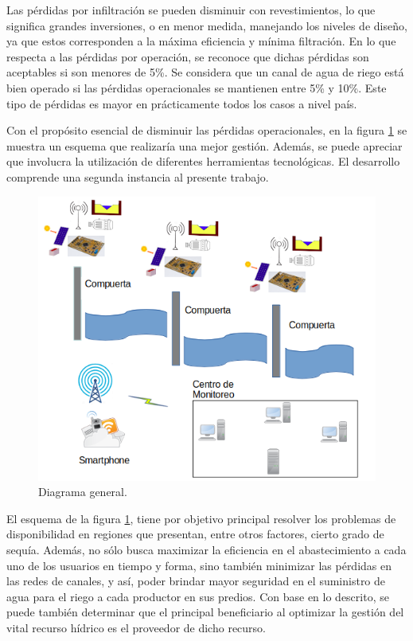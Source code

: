 Las pérdidas por infiltración se pueden disminuir con revestimientos, lo que significa grandes inversiones, o en menor medida, manejando los niveles de diseño, ya que estos corresponden a la máxima eficiencia y mínima filtración.
En lo que respecta a las pérdidas por operación, se reconoce que dichas pérdidas son aceptables si son menores de 5\%. Se considera que un canal de agua de riego está bien operado si las pérdidas operacionales se mantienen entre 5\% y 10\%. Este tipo de pérdidas es mayor en prácticamente todos los casos a nivel país.		

Con el propósito esencial de disminuir las pérdidas operacionales, en la figura \ref{fig:DiagramaEnBloqueGeneralV1} se muestra un esquema que realizaría una mejor gestión.
Además, se puede apreciar que involucra la utilización de diferentes herramientas tecnológicas. El desarrollo comprende una segunda instancia al presente trabajo. 
    
\begin{figure}[h]
\centering

\includegraphics[width=1\textwidth]{./Figures/DiagramaEnBloqueGeneralV2.png}
\caption{Diagrama general.}
\label{fig:DiagramaEnBloqueGeneralV1}
\end{figure}

El esquema de la figura \ref{fig:DiagramaEnBloqueGeneralV1}, tiene por objetivo principal resolver los problemas de disponibilidad en regiones que presentan, entre otros factores, cierto grado de sequía. Además, no sólo busca maximizar la eficiencia en el abastecimiento a cada uno de los usuarios en tiempo y forma, sino también minimizar las pérdidas en las redes de canales, y así, poder brindar mayor seguridad en el suministro de agua para el riego a cada productor en sus predios.
Con base en lo descrito, se puede también determinar que el principal beneficiario al optimizar la gestión del vital recurso hídrico es el proveedor de dicho recurso.

